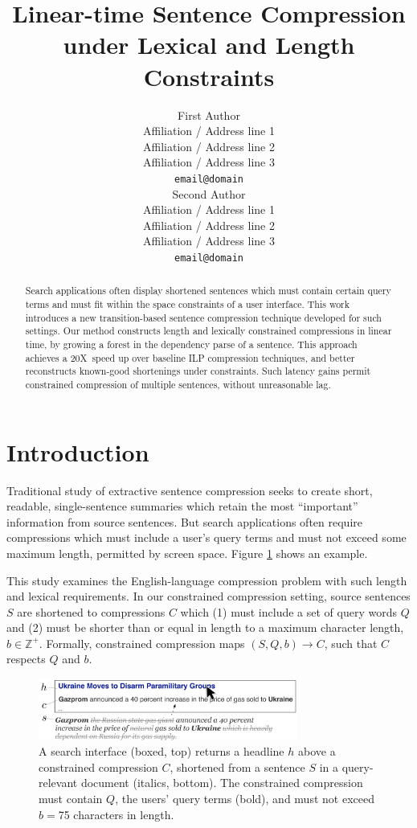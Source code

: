 \documentclass[11pt,a4paper]{article}
\title{Linear-time Sentence Compression under Lexical and Length Constraints}
\author{First Author \\
  Affiliation / Address line 1 \\
  Affiliation / Address line 2 \\
  Affiliation / Address line 3 \\
  {\tt email@domain} \\\And
  Second Author \\
  Affiliation / Address line 1 \\
  Affiliation / Address line 2 \\
  Affiliation / Address line 3 \\
  {\tt email@domain} \\}
\date{}
\newcommand{\speedup}[0]{20X~}
\begin{document}
\maketitle

\begin{abstract}
Search applications often display shortened sentences which must contain certain query terms and must fit within the space constraints of a user interface. This work introduces a new transition-based sentence compression technique developed for such settings. Our method constructs length and lexically constrained compressions in linear time, by growing a forest in the dependency parse of a sentence. This approach achieves a \speedup speed up over baseline ILP compression techniques, and better reconstructs known-good shortenings under constraints. Such latency gains permit constrained compression of multiple sentences, without unreasonable lag.
\end{abstract}


\section{Introduction}\label{s:intro}

Traditional study of extractive sentence compression seeks to create short, readable, single-sentence summaries which retain the most ``important'' information from source sentences. But search applications often require compressions which must include a user's query terms and must not exceed some maximum length, permitted by screen space.  Figure \ref{f:qf} shows an example.

This study examines the English-language compression problem with such length and lexical requirements. In our constrained compression setting, source sentences $S$ are shortened to compressions $C$ which (1) must include a set of query words $Q$ and (2) must be shorter than or equal in length to a maximum character length, $b \in \mathbb{Z}^{+}$. Formally, constrained compression maps $(S,Q,b) \rightarrow C$, such that $C$ respects $Q$ and $b$.

\begin{figure}[htb!]
\includegraphics[width=8.5cm]{qf.pdf}
\caption{A search interface (boxed, top) returns a headline $h$ above a constrained compression $C$, shortened from a sentence $S$ in a query-relevant document (italics, bottom). The constrained compression must contain $Q$, the users' query terms (bold), and must not exceed $b=$75 characters in length.}
\label{f:qf}
\end{figure}
\end{document}

